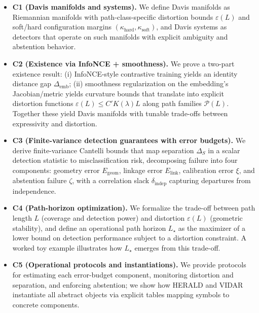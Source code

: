 \documentclass[11pt]{article}
\begin{document}
\begin{itemize}[leftmargin=*]
    \item \textbf{C1 (Davis manifolds and systems).} We define Davis manifolds as Riemannian manifolds with path-class-specific distortion bounds $\varepsilon(L)$ and soft/hard configuration margins $(\kappa_{\text{hard}}, \kappa_{\text{soft}})$, and Davis systems as detectors that operate on such manifolds with explicit ambiguity and abstention behavior.
    \item \textbf{C2 (Existence via InfoNCE + smoothness).} We prove a two-part existence result: (i) InfoNCE-style contrastive training yields an identity distance gap $\Delta_{\text{emb}}$; (ii) smoothness regularization on the embedding's Jacobian/metric yields curvature bounds that translate into explicit distortion functions $\varepsilon(L) \leq C'K(\lambda)L$ along path families $\mathcal{P}(L)$. Together these yield Davis manifolds with tunable trade-offs between expressivity and distortion.
    \item \textbf{C3 (Finite-variance detection guarantees with error budgets).} We derive finite-variance Cantelli bounds that map separation $\Delta_S$ in a scalar detection statistic to misclassification risk, decomposing failure into four components: geometry error $E_{\text{geom}}$, linkage error $E_{\text{link}}$, calibration error $\xi$, and abstention failure $\zeta$, with a correlation slack $\delta_{\text{indep}}$ capturing departures from independence.
    \item \textbf{C4 (Path-horizon optimization).} We formalize the trade-off between path length $L$ (coverage and detection power) and distortion $\varepsilon(L)$ (geometric stability), and define an operational path horizon $L_\star$ as the maximizer of a lower bound on detection performance subject to a distortion constraint. A worked toy example illustrates how $L_\star$ emerges from this trade-off.
    \item \textbf{C5 (Operational protocols and instantiations).} We provide protocols for estimating each error-budget component, monitoring distortion and separation, and enforcing abstention; we show how HERALD and VIDAR instantiate all abstract objects via explicit tables mapping symbols to concrete components. 
\end{itemize}
\end{document}
